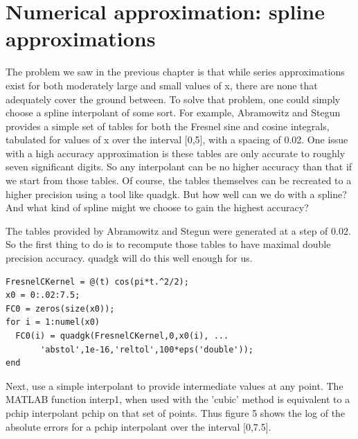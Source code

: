 \documentclass[a4paper,11pt]{article}
\begin{document}
\section{Numerical approximation: spline approximations}

The problem we saw in the previous chapter is that while series approximations exist for both moderately large and small values of x, there are none that adequately cover the ground between. To solve that problem, one could simply choose a spline interpolant of some sort. For example, Abramowitz and Stegun provides a simple set of tables for both the Fresnel sine and cosine integrals, tabulated for values of x over the interval [0,5], with a spacing of 0.02. One issue with a high accuracy approximation is these tables are only accurate to roughly seven significant digits. So any interpolant can be no higher accuracy than that if we start from those tables. Of course, the tables themselves can be recreated to a higher precision using a tool like quadgk. But how well can we do with a spline? And what kind of spline might we choose to gain the highest accuracy?

The tables provided by Abramowitz and Stegun were generated at a step of 0.02. So the first thing to do is to recompute those tables to have maximal double precision accuracy. quadgk will do this well enough for us.

\begin{lstlisting}
FresnelCKernel = @(t) cos(pi*t.^2/2);
x0 = 0:.02:7.5;
FC0 = zeros(size(x0));
for i = 1:numel(x0)
  FC0(i) = quadgk(FresnelCKernel,0,x0(i), ...
       'abstol',1e-16,'reltol',100*eps('double'));
end
\end{lstlisting}

Next, use a simple interpolant to provide intermediate values at any point. The MATLAB function interp1, when used with the 'cubic' method is equivalent to a pchip interpolant pchip on that set of points. Thus figure 5 shows the log of the absolute errors for a pchip interpolant over the interval [0,7.5].
\end{document}
